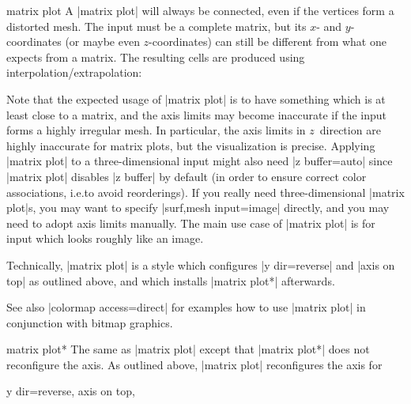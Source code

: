 {\begin{plottype}[/pgfplots]{matrix plot}
    A |matrix plot| will always be connected, even if the vertices form a
    distorted mesh. The input must be a complete matrix, but its $x$- and
    $y$-coordinates (or maybe even $z$-coordinates) can still be different from
    what one expects from a matrix. The resulting cells are produced using
    interpolation/extrapolation:
\begin{codeexample}[]
\end{codeexample}
    Note that the expected usage of |matrix plot| is to have something which is
    at least close to a matrix, and the axis limits may become inaccurate if
    the input forms a highly irregular mesh. In particular, the axis limits in
    $z$~direction are highly inaccurate for matrix plots, but the visualization
    is precise. Applying |matrix plot| to a three-dimensional input might also
    need |z buffer=auto| since |matrix plot| disables |z buffer| by default (in
    order to ensure correct color associations, i.e.\@ to avoid reorderings).
    If you really need three-dimensional |matrix plot|s, you may want to
    specify |surf,mesh input=image| directly, and you may need to adopt axis
    limits manually. The main use case of |matrix plot| is for input which
    looks roughly like an image.

    Technically, |matrix plot| is a style which configures |y dir=reverse| and
    |axis on top| as outlined above, and which installs |matrix plot*|
    afterwards.

    See also |colormap access=direct| for examples how to use |matrix plot| in
    conjunction with bitmap graphics.
\end{plottype}

\begin{plottype}{matrix plot*}
    The same as |matrix plot| except that |matrix plot*| does not reconfigure
    the axis. As outlined above, |matrix plot| reconfigures the axis for
\begin{codeexample}
y dir=reverse,
axis on top,
\end{codeexample}


\end{plottype}}
